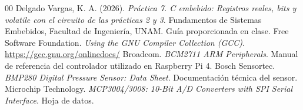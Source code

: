 \documentclass[conference]{IEEEtran}
\begin{document}
\begin{thebibliography}{00}
 Delgado Vargas, K. A. (2026). \textit{Práctica 7. C embebido: Registros reales, bits y volatile con el circuito de las prácticas 2 y 3}. Fundamentos de Sistemas Embebidos, Facultad de Ingeniería, UNAM. Guía proporcionada en clase.
 Free Software Foundation. \textit{Using the GNU Compiler Collection (GCC)}. \url{https://gcc.gnu.org/onlinedocs/}
 Broadcom. \textit{BCM2711 ARM Peripherals}. Manual de referencia del controlador utilizado en Raspberry Pi 4.
 Bosch Sensortec. \textit{BMP280 Digital Pressure Sensor: Data Sheet}. Documentación técnica del sensor.
 Microchip Technology. \textit{MCP3004/3008: 10-Bit A/D Converters with SPI Serial Interface}. Hoja de datos.
\end{thebibliography}
\end{document}
